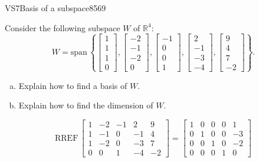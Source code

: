 \begin{exercise}{VS7}{Basis of a subspace}{8569} 
\begin{exerciseStatement} 

 Consider the following subspace \(W\) of \(\mathbb R^4\): \[W=\mathrm{span}\,\left\{ \left[\begin{array}{c}
1 \\
1 \\
1 \\
0
\end{array}\right] , \left[\begin{array}{c}
-2 \\
-1 \\
-2 \\
0
\end{array}\right] , \left[\begin{array}{c}
-1 \\
0 \\
0 \\
1
\end{array}\right] , \left[\begin{array}{c}
2 \\
-1 \\
-3 \\
-4
\end{array}\right] , \left[\begin{array}{c}
9 \\
4 \\
7 \\
-2
\end{array}\right] \right\}.\] 

 

\begin{enumerate}[(a)]
\item 

Explain how to find a basis of \(W\).


\item 

Explain how to find the dimension of \(W\).


\end{enumerate}

     \end{exerciseStatement}
 \begin{exerciseAnswer} 

\[\mathrm{RREF}\,\left[\begin{array}{ccccc}
1 & -2 & -1 & 2 & 9 \\
1 & -1 & 0 & -1 & 4 \\
1 & -2 & 0 & -3 & 7 \\
0 & 0 & 1 & -4 & -2
\end{array}\right]=\left[\begin{array}{ccccc}
1 & 0 & 0 & 0 & 1 \\
0 & 1 & 0 & 0 & -3 \\
0 & 0 & 1 & 0 & -2 \\
0 & 0 & 0 & 1 & 0
\end{array}\right]\]


\end{exerciseAnswer}
\end{exercise}
